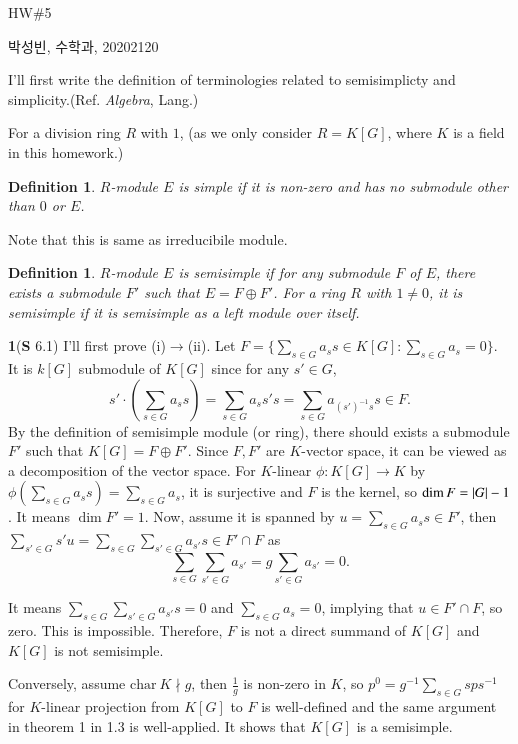 \documentclass[a4paper, 12pt]{article}
\theoremstyle{Mydefinition}
\newtheorem{definition}[statement]{Definition}
\theoremstyle{Mytheorem}
\begin{document}
\thispagestyle{myfirstpage}
\begin{center}
	\Large{HW\#5}
\end{center}
박성빈, 수학과, 20202120

I'll first write the definition of terminologies related to semisimplicty and simplicity.(Ref. \textit{Algebra}, Lang.)

For a division ring $R$ with $1$, (as we only consider $R=K[G]$, where $K$ is a field in this homework.)
\begin{definition}
$R$-module $E$ is simple if it is non-zero and has no submodule other than $0$ or $E$.
\end{definition}
Note that this is same as irreducibile module.
\begin{definition}
$R$-module $E$ is semisimple if for any submodule $F$ of $E$, there exists a submodule $F'$ such that $E=F\oplus F'$. For a ring $R$ with $1\neq 0$, it is semisimple if it is semisimple as a left module over itself.
\end{definition}
\noindent \textbf{1}(\textbf{S} 6.1)
I'll first prove (i)$\rightarrow$(ii). Let $F = \{\sum_{s\in G}a_s s\in K[G]:\sum_{s\in G}a_s = 0\}$. It is $k[G]$ submodule of $K[G]$ since for any $s'\in G$,
\begin{equation}
    s'\cdot \left(\sum_{s\in G}a_s s\right) = \sum_{s\in G}a_s s's = \sum_{s\in G}a_{(s')^{-1}s} s \in F.
\end{equation}
By the definition of semisimple module (or ring), there should exists a submodule $F'$ such that $K[G]=F\oplus F'$. Since $F,F'$ are $K$-vector space, it can be viewed as a decomposition of the vector space. For $K$-linear $\phi:K[G]\rightarrow K$ by $\phi(\sum_{s\in G}a_s s) = \sum_{s\in G}a_s$, it is surjective and $F$ is the kernel, so $\dim F = \abs{G}-1$. It means $\dim F' = 1$. Now, assume it is spanned by $u = \sum_{s\in G}a_s s\in F'$, then $\sum_{s'\in G}s'u = \sum_{s\in G}\sum_{s'\in G}a_{s'} s\in F'\cap F$ as 
\begin{equation}
    \sum_{s\in G}\sum_{s'\in G}a_{s'} = g\sum_{s'\in G}a_{s'} = 0.
\end{equation}

It means $\sum_{s\in G}\sum_{s'\in G}a_{s'} s = 0$ and $\sum_{s\in G}a_{s} = 0$, implying that $u\in F'\cap F$, so zero. This is impossible. Therefore, $F$ is not a direct summand of $K[G]$ and $K[G]$ is not semisimple.

Conversely, assume $\mathrm{char}~K\nmid g$, then $\frac{1}{g}$ is non-zero in $K$, so $p^0 = g^{-1}\sum_{s\in G}sps^{-1}$ for $K$-linear projection from $K[G]$ to $F$ is well-defined and the same argument in theorem 1 in 1.3 is well-applied. It shows that $K[G]$ is a semisimple.\\
\end{document}
